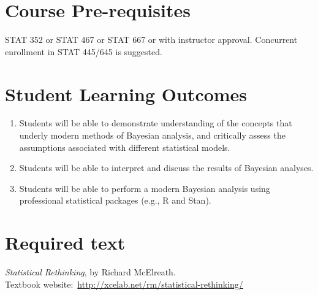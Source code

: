 \documentclass[11pt,onecolumn]{article}
\begin{document}
\section*{Course Pre-requisites}
STAT 352 or STAT 467 or STAT 667 or with instructor approval. Concurrent enrollment in STAT 445/645 is suggested.

\section*{Student Learning Outcomes}
\begin{enumerate}
\item Students will be able to demonstrate understanding of the concepts that underly modern methods of Bayesian analysis, and critically assess the assumptions associated with different statistical models.
\item Students will be able to interpret and discuss the results of Bayesian analyses.
\item Students will be able to perform a modern Bayesian analysis using professional statistical packages (e.g., \textsf{R} and \textsf{Stan}).
\end{enumerate}

\section*{Required text}
\emph{Statistical Rethinking}, by Richard McElreath. \\
Textbook website:~\url{http://xcelab.net/rm/statistical-rethinking/}
\end{document}

